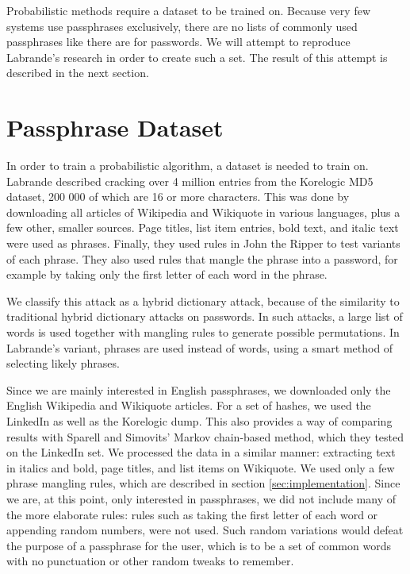 \documentclass{article}
\begin{document}
Probabilistic methods require a dataset to be trained on. Because very few
systems use passphrases exclusively, there are no lists of commonly used
passphrases like there are for passwords. We will attempt to reproduce
Labrande's research\cite{crackmeimfamous} in order to create such a set. The
result of this attempt is described in the next section.


\section{Passphrase Dataset}\label{sec:dataset}

In order to train a probabilistic algorithm, a dataset is needed to train on.
Labrande described cracking over 4 million entries from the
Korelogic\cite{korelogic} MD5 dataset, 200 000 of which are 16 or more
characters. This was done by downloading all articles of Wikipedia and
Wikiquote in various languages, plus a few other, smaller sources. Page titles,
list item entries, bold text, and italic text were used as phrases. Finally,
they used rules in John the Ripper to test variants of each phrase. They also
used rules that mangle the phrase into a password, for example by taking only
the first letter of each word in the phrase.

We classify this attack as a hybrid dictionary attack, because of the
similarity to traditional hybrid dictionary attacks on passwords. In such
attacks, a large list of words is used together with mangling rules to generate
possible permutations. In Labrande's variant, phrases are used instead of
words, using a smart method of selecting likely phrases.

Since we are mainly interested in English passphrases, we downloaded only the
English Wikipedia and Wikiquote articles. For a set of hashes, we used the
LinkedIn as well as the Korelogic dump. This also provides a way of comparing
results with Sparell and Simovits'\cite{sparell-simovits} Markov chain-based
method, which they tested on the LinkedIn set. We processed the data in a
similar manner: extracting text in italics and bold, page titles, and list
items on Wikiquote. We used only a few phrase mangling rules, which are
described in section \ref{sec:implementation}. Since we are, at this point,
only interested in passphrases, we did not include many of the more elaborate
rules: rules such as taking the first letter of each word or appending random
numbers, were not used. Such random variations would defeat the purpose of a
passphrase for the user, which is to be a set of common words with no
punctuation or other random tweaks to remember.
\end{document}
